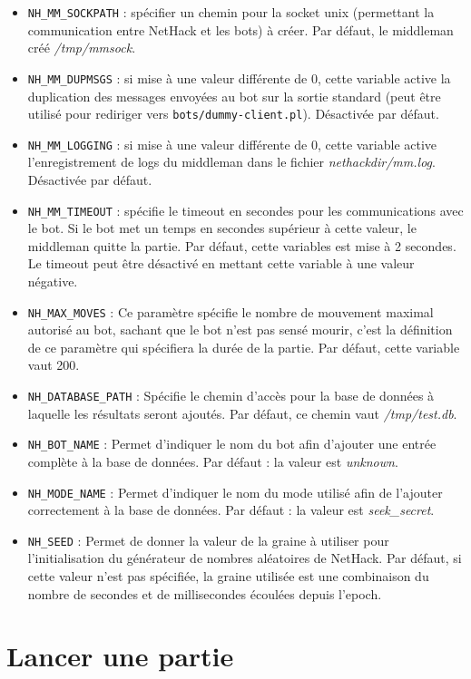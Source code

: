 \documentclass[10pt,a4paper]{report}
\begin{document}
\begin{itemize}
\item \verb!NH_MM_SOCKPATH! : spécifier un chemin pour la socket unix (permettant la communication entre NetHack et les bots) à créer. Par défaut, le middleman créé \emph{/tmp/mmsock}.
\item \verb!NH_MM_DUPMSGS! : si mise à une valeur différente de 0, cette
	variable active la duplication des messages envoyées au bot sur la sortie
	standard (peut être utilisé pour rediriger vers \verb!bots/dummy-client.pl!).
	Désactivée par défaut.
\item \verb!NH_MM_LOGGING! : si mise à une valeur différente de 0, cette variable active l'enregistrement de logs du middleman dans le fichier \emph{nethackdir/mm.log}. Désactivée par défaut.
\item \verb!NH_MM_TIMEOUT! : spécifie le timeout en secondes pour les communications avec le bot. Si le bot met un temps en secondes supérieur à cette valeur, le middleman quitte la partie. Par défaut, cette variables est mise à 2 secondes. Le timeout peut être désactivé en mettant cette variable à une valeur négative.
\item \verb!NH_MAX_MOVES! :
  Ce paramètre spécifie le nombre de mouvement maximal autorisé au bot, sachant
  que le bot n'est pas sensé mourir, c'est la définition de ce paramètre qui
  spécifiera la durée de la partie. Par défaut, cette variable vaut 200.
\item \verb!NH_DATABASE_PATH! :
  Spécifie le chemin d'accès pour la base de données à laquelle les résultats
  seront ajoutés. Par défaut, ce chemin vaut \emph{/tmp/test.db}.
\item \verb!NH_BOT_NAME! :
  Permet d'indiquer le nom du bot afin d'ajouter une entrée complète à la base
  de données. Par défaut : la valeur est \emph{unknown}.
\item \verb!NH_MODE_NAME! :
  Permet d'indiquer le nom du mode utilisé afin de l'ajouter correctement à la
  base de données. Par défaut : la valeur est \emph{seek\_secret}.
\item \verb!NH_SEED! :
  Permet de donner la valeur de la graine à utiliser pour l'initialisation du
  générateur de nombres aléatoires de NetHack. Par défaut, si cette
  valeur n'est pas spécifiée, la graine utilisée est une combinaison du nombre
  de secondes et de millisecondes écoulées depuis l'epoch.
\end{itemize}

\section{Lancer une partie}
\end{document}

